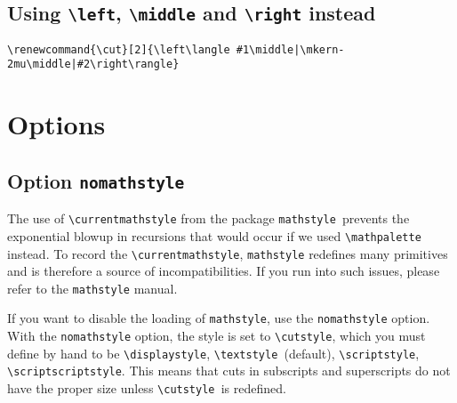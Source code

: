 \documentclass[12pt,a4paper,british]{scrartcl}
\begin{document}
\subsection{Using \texttt{\textbackslash{}left}, \texttt{\textbackslash{}middle}
and \texttt{\textbackslash{}right} instead}

\noindent \texttt{\footnotesize{\textbackslash{}renewcommand\{\textbackslash{}cut\}{[}2{]}\{\textbackslash{}left\textbackslash{}langle
\#1\textbackslash{}middle|\textbackslash{}mkern-2mu\textbackslash{}middle|\#2\textbackslash{}right\textbackslash{}rangle\}}}{\footnotesize \par}

\begin{center}
\end{center}


\section{Options}


\subsection{Option \texttt{nomathstyle}}

The use of \texttt{\textbackslash{}currentmathstyle} from the package
\texttt{mathstyle }prevents the  exponential blowup in recursions
that would occur if we used \texttt{\textbackslash{}mathpalette} instead.
To record the \texttt{\textbackslash{}currentmath\-style}, \texttt{mathstyle}
redefines many  primitives and is therefore a source of incompatibilities.
If you run into such issues, please refer to the \texttt{mathstyle}
manual.

If you want to  disable the loading of \texttt{mathstyle}, use the
\texttt{nomathstyle} option.  With the \texttt{nomathstyle} option,
the style is set to \texttt{\textbackslash{}cutstyle}, which you must
 define by hand to be \texttt{\textbackslash{}displaystyle}, \texttt{\textbackslash{}textstyle
}(default), \texttt{\textbackslash{}scriptstyle},  \texttt{\textbackslash{}scriptscriptstyle}.
This means that cuts in subscripts and superscripts do  not have the
proper size unless \texttt{\textbackslash{}cutstyle }is redefined.
\end{document}
